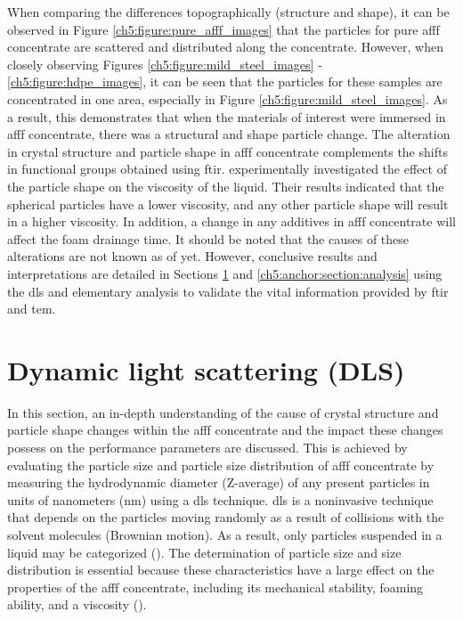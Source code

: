 When comparing the differences topographically (structure and shape), it can be observed in Figure \ref{ch5:figure:pure_afff_images} that the particles for pure \acrshort{afff} concentrate are scattered and distributed along the concentrate. However, when closely observing Figures \ref{ch5:figure:mild_steel_images} - \ref{ch5:figure:hdpe_images}, it can be seen that the particles for these samples are concentrated in one area, especially in Figure \ref{ch5:figure:mild_steel_images}. As a result, this demonstrates that when the materials of interest were immersed in \acrshort{afff} concentrate, there was a structural and shape particle change. The alteration in crystal structure and particle shape in \acrshort{afff} concentrate complements the shifts in functional groups obtained using \acrshort{ftir}. \cite{an2018effect} experimentally investigated the effect of the particle shape on the viscosity of the liquid. Their results indicated that the spherical particles have a lower viscosity, and any other particle shape will result in a higher viscosity. In addition, a change in any additives in \acrshort{afff} concentrate will affect the foam drainage time. It should be noted that the causes of these alterations are not known as of yet. However, conclusive results and interpretations are detailed in Sections \ref{ch5:anchor:section:dls} and \ref{ch5:anchor:section:analysis} using the \acrshort{dls} and elementary analysis to validate the vital information provided by \acrshort{ftir} and \acrshort{tem}.

\section{Dynamic light scattering (DLS)}
\label{ch5:anchor:section:dls}
In this section, an in-depth understanding of the cause of crystal structure and particle shape changes within the \acrshort{afff} concentrate and the impact these changes possess on the performance parameters are discussed. This is achieved by evaluating the particle size and particle size distribution of \acrshort{afff} concentrate by measuring the hydrodynamic diameter (Z-average) of any present particles in units of nanometers (nm) using a \acrshort{dls} technique. \acrshort{dls} is a noninvasive technique that depends on the particles moving randomly as a result of collisions with the solvent molecules (Brownian motion). As a result, only particles suspended in a liquid may be categorized (\cite{machhi2021effect}). The determination of particle size and size distribution is essential because these characteristics have a large effect on the properties of the \acrshort{afff} concentrate, including its mechanical stability, foaming ability, and a viscosity (\cite{de2017detection}).

